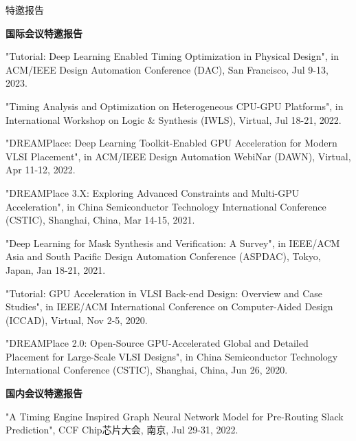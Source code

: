 \begin{rSection}{特邀报告}


\textbf{国际会议特邀报告}
        
\begin{description}[font=\normalfont]

\item[{[T7]}]{
"Tutorial: Deep Learning Enabled Timing Optimization in Physical Design", in ACM/IEEE Design Automation Conference (DAC), San Francisco, Jul 9-13, 2023. 
}

\item[{[T6]}]{
"Timing Analysis and Optimization on Heterogeneous CPU-GPU Platforms", in International Workshop on Logic \& Synthesis (IWLS), Virtual, Jul 18-21, 2022. 
}

\item[{[T5]}]{
"DREAMPlace: Deep Learning Toolkit-Enabled GPU Acceleration for Modern VLSI Placement", in ACM/IEEE Design Automation WebiNar (DAWN), Virtual, Apr 11-12, 2022. 
}

\item[{[T4]}]{
"DREAMPlace 3.X: Exploring Advanced Constraints and Multi-GPU Acceleration", in China Semiconductor Technology International Conference (CSTIC), Shanghai, China, Mar 14-15, 2021. 
}

\item[{[T3]}]{
"Deep Learning for Mask Synthesis and Verification: A Survey", in IEEE/ACM Asia and South Pacific Design Automation Conference (ASPDAC), Tokyo, Japan, Jan 18-21, 2021.
}

\item[{[T2]}]{
"Tutorial: GPU Acceleration in VLSI Back-end Design: Overview and Case Studies", in IEEE/ACM International Conference on Computer-Aided Design (ICCAD), Virtual, Nov 2-5, 2020. 
}

\item[{[T1]}]{
"DREAMPlace 2.0: Open-Source GPU-Accelerated Global and Detailed Placement for Large-Scale VLSI Designs", in China Semiconductor Technology International Conference (CSTIC), Shanghai, China, Jun 26, 2020. 
}

\end{description}


\textbf{国内会议特邀报告}
        
\begin{description}[font=\normalfont]

\item[{[T7]}]{
"A Timing Engine Inspired Graph Neural Network Model for Pre-Routing Slack Prediction", CCF Chip芯片大会, 南京, Jul 29-31, 2022. 
}


\end{description}
\end{rSection}
